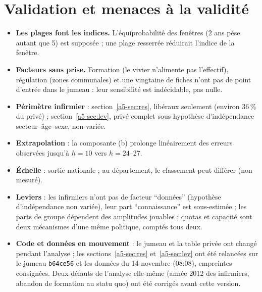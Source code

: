 \section{Validation et menaces à la validité}
\begin{itemize}
  \item \textbf{Les plages font les indices.} L'équiprobabilité des fenêtres (2 ans pèse autant que 5) est
        supposée ; une plage resserrée réduirait l'indice de la fenêtre.
  \item \textbf{Facteurs sans prise.} Formation (le vivier n'alimente pas l'effectif), régulation (zones
        communales) et une vingtaine de fiches n'ont pas de point d'entrée dans le jumeau : leur sensibilité est
        indécidable, pas nulle.
  \item \textbf{Périmètre infirmier} : section~\ref{a5-sec:res}, libéraux seulement (environ 36\,\%\derive{} du privé) ;
        section~\ref{a5-sec:lev}, privé complet sous hypothèse d'indépendance secteur--âge--sexe, non variée.
  \item \textbf{Extrapolation} : la composante (b) prolonge linéairement des erreurs observées jusqu'à $h = 10$
        vers $h = 24$--27.
  \item \textbf{Échelle} : sortie nationale ; au département, le classement peut différer (non mesuré).
  \item \textbf{Leviers} : les infirmiers n'ont pas de facteur \enquote{données} (hypothèse d'indépendance non variée),
        leur part \enquote{connaissance} est sous-estimée ; les parts de groupe dépendent des amplitudes jouables ;
        quotas et capacité sont deux mécanismes d'une même politique, comptés tous deux.
  \item \textbf{Code et données en mouvement} : le jumeau et la table privée ont changé pendant l'analyse ; les
        sections~\ref{a5-sec:res} et~\ref{a5-sec:lev} ont été relancées sur le jumeau \texttt{b64ce56} et les données
        du 14 novembre (08:08), empreintes consignées. Deux défauts de l'analyse elle-même (année 2012 des
        infirmiers, abandon de formation au statu quo) ont été corrigés avant cette version.
\end{itemize}

